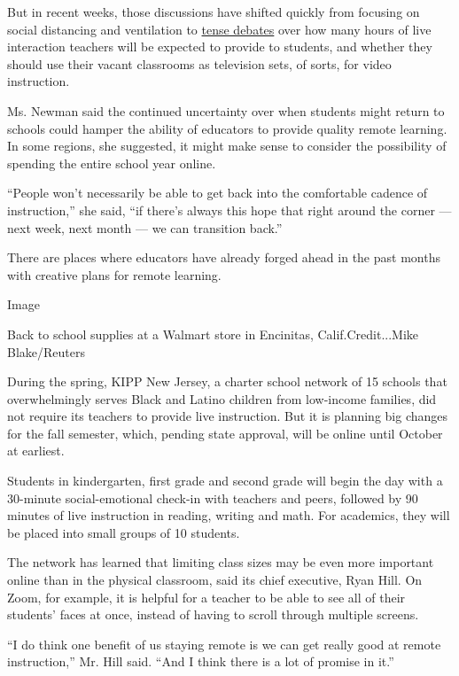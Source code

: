 But in recent weeks, those discussions have shifted quickly from
focusing on social distancing and ventilation to
\href{https://www.nytimes3xbfgragh.onion/2020/07/29/us/teacher-union-school-reopening-coronavirus.html}{tense
debates} over how many hours of live interaction teachers will be
expected to provide to students, and whether they should use their
vacant classrooms as television sets, of sorts, for video instruction.

Ms. Newman said the continued uncertainty over when students might
return to schools could hamper the ability of educators to provide
quality remote learning. In some regions, she suggested, it might make
sense to consider the possibility of spending the entire school year
online.

``People won't necessarily be able to get back into the comfortable
cadence of instruction,'' she said, ``if there's always this hope that
right around the corner --- next week, next month --- we can transition
back.''

There are places where educators have already forged ahead in the past
months with creative plans for remote learning.

Image

Back to school supplies at a Walmart store in Encinitas,
Calif.Credit...Mike Blake/Reuters

During the spring, KIPP New Jersey, a charter school network of 15
schools that overwhelmingly serves Black and Latino children from
low-income families, did not require its teachers to provide live
instruction. But it is planning big changes for the fall semester,
which, pending state approval, will be online until October at earliest.

Students in kindergarten, first grade and second grade will begin the
day with a 30-minute social-emotional check-in with teachers and peers,
followed by 90 minutes of live instruction in reading, writing and math.
For academics, they will be placed into small groups of 10 students.

The network has learned that limiting class sizes may be even more
important online than in the physical classroom, said its chief
executive, Ryan Hill. On Zoom, for example, it is helpful for a teacher
to be able to see all of their students' faces at once, instead of
having to scroll through multiple screens.

``I do think one benefit of us staying remote is we can get really good
at remote instruction,'' Mr. Hill said. ``And I think there is a lot of
promise in it.''

